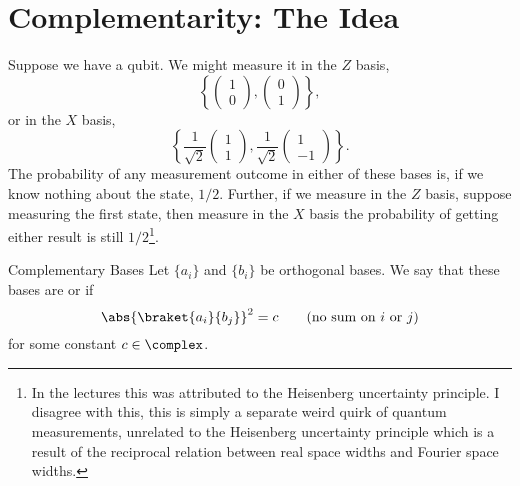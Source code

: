 \documentclass[fleqn]{NotesClass}
\begin{document}
    \section{Complementarity: The Idea}
    Suppose we have a qubit.
    We might measure it in the \(Z\) basis,
    \begin{equation}
        \left\{
            \begin{pmatrix}
                1\\ 0
            \end{pmatrix}
            ,
            \begin{pmatrix}
                0\\ 1
            \end{pmatrix}
        \right\},
    \end{equation}
    or in the \(X\) basis,
    \begin{equation}
        \left\{ \frac{1}{\sqrt{2}}
        \begin{pmatrix}
            1\\ 1
        \end{pmatrix}
        , \frac{1}{\sqrt{2}}
        \begin{pmatrix}
            1\\ -1
        \end{pmatrix}
        \right\}.
    \end{equation}
    The probability of any measurement outcome in either of these bases is, if we know nothing about the state, \(1/2\).
    Further, if we measure in the \(Z\) basis, suppose measuring the first state, then measure in the \(X\) basis the probability of getting either result is still \(1/2\)\footnote{In the lectures this was attributed to the Heisenberg uncertainty principle. I disagree with this, this is simply a separate weird quirk of quantum measurements, unrelated to the Heisenberg uncertainty principle which is a result of the reciprocal relation between real space widths and Fourier space widths.}.
    
    \begin{dfn}{Complementary Bases}{}
        Let \(\{a_i\}\) and \(\{b_i\}\) be orthogonal bases.
        We say that these bases are  or  if
        \begin{equation}
            \abs{\braket{a_i}{b_j}}^2 = c \qquad (\text{no sum on \(i\) or \(j\)})
        \end{equation}
        for some constant \(c \in \complex\).
    \end{dfn}
    
\end{document}
